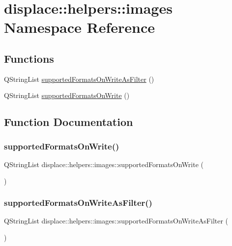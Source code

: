 \hypertarget{namespacedisplace_1_1helpers_1_1images}{}\section{displace\+::helpers\+::images Namespace Reference}
\label{namespacedisplace_1_1helpers_1_1images}
\subsection*{Functions}
\begin{DoxyCompactItemize}
\item 
Q\+String\+List \mbox{\hyperlink{namespacedisplace_1_1helpers_1_1images_a0bf6120effd4ee7d585bb13c190fe15d}{supported\+Formats\+On\+Write\+As\+Filter}} ()
\item 
Q\+String\+List \mbox{\hyperlink{namespacedisplace_1_1helpers_1_1images_a3eac14a3de2f09d07ed3c6fae34384bc}{supported\+Formats\+On\+Write}} ()
\end{DoxyCompactItemize}


\subsection{Function Documentation}
\mbox{\label{namespacedisplace_1_1helpers_1_1images_a3eac14a3de2f09d07ed3c6fae34384bc}} 
\subsubsection{\texorpdfstring{supportedFormatsOnWrite()}{supportedFormatsOnWrite()}}
{\footnotesize\ttfamily Q\+String\+List displace\+::helpers\+::images\+::supported\+Formats\+On\+Write (\begin{DoxyParamCaption}{ }\end{DoxyParamCaption})}

\mbox{\label{namespacedisplace_1_1helpers_1_1images_a0bf6120effd4ee7d585bb13c190fe15d}} 
\subsubsection{\texorpdfstring{supportedFormatsOnWriteAsFilter()}{supportedFormatsOnWriteAsFilter()}}
{\footnotesize\ttfamily Q\+String\+List displace\+::helpers\+::images\+::supported\+Formats\+On\+Write\+As\+Filter (\begin{DoxyParamCaption}{ }\end{DoxyParamCaption})}

